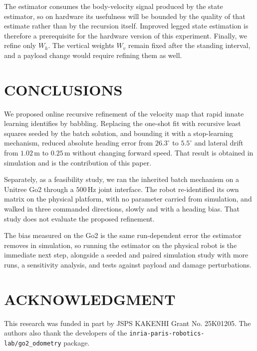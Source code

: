 \documentclass[a4paper, 10pt, conference]{ieeeconf}
\begin{document}
The estimator consumes the body-velocity signal produced by the state
estimator, so on hardware its usefulness will be bounded by the quality of that
estimate rather than by the recursion itself. Improved legged state estimation
\cite{yang2023} is therefore a prerequisite for the hardware version of this
experiment. Finally, we refine only $W_h$. The vertical weights $W_v$ remain
fixed after the standing interval, and a payload change would require refining
them as well.



\section{CONCLUSIONS}

We proposed online recursive refinement of the velocity map that rapid
innate learning identifies by babbling. Replacing the one-shot fit with recursive
least squares seeded by the batch solution, and bounding it with a stop-learning
mechanism, reduced absolute heading error from $26.3^\circ$ to $5.5^\circ$ and
lateral drift from $1.02$\,m to $0.25$\,m without changing forward speed. That
result is obtained in simulation and is the contribution of this paper.



Separately, as a feasibility study, we ran the inherited batch
mechanism on a Unitree Go2 through a $500$\,Hz joint interface. The robot
re-identified its own matrix on the physical platform, with no parameter carried
from simulation, and walked in three commanded directions, slowly and with a
heading bias. That study does not evaluate the proposed refinement.



The bias measured on the Go2 is the same run-dependent error the
estimator removes in simulation, so running the estimator on the physical robot
is the immediate next step, alongside a seeded and paired simulation study with
more runs, a sensitivity analysis, and tests against payload and damage
perturbations.

\section*{ACKNOWLEDGMENT}

This research was funded in part by JSPS KAKENHI Grant No. 25K01205. The authors also thank the developers of the \texttt{inria-paris-robotics-lab/go2\_odometry} package.
\end{document}
